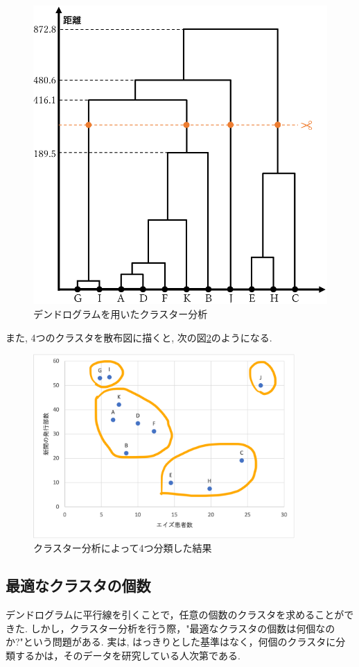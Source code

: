\documentclass[a4paper,11pt,dvipdfmx]{jsarticle}
\begin{document}
\begin{figure}[htb]
  \centering
  \includegraphics[width=12cm]{../pics/dendro_orange.png}
  \caption{デンドログラムを用いたクラスター分析}
  \label{fig:dendro_orange}
\end{figure}

\newpage
また, 4つのクラスタを散布図に描くと, 次の図\ref{fig:aids4}のようになる. 

\begin{figure}[htb]
  \centering
  \includegraphics[width=10cm]{../pics/aids_4.png}
  \caption{クラスター分析によって4つ分類した結果}
  \label{fig:aids4}
\end{figure}

\subsection*{最適なクラスタの個数}
デンドログラムに平行線を引くことで，任意の個数のクラスタを求めることができた.
しかし，クラスター分析を行う際，"最適なクラスタの個数は何個なのか?"という問題がある. 実は, はっきりとした基準はなく，何個のクラスタに分類するかは，そのデータを研究している人次第である.
\end{document}
